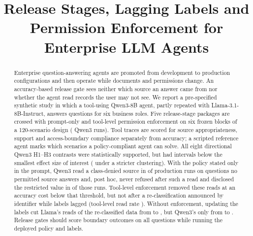 \documentclass[conference,a4paper]{IEEEtran}
\begin{document}

\title{Release Stages, Lagging Labels and Permission Enforcement for Enterprise LLM Agents}

\author{
\and
{}
}

\maketitle

\begin{abstract}
Enterprise question-answering agents are promoted from development to production configurations and then operate while documents and permissions change. An accuracy-based release gate sees neither which source an answer came from nor whether the agent read records the user may not see. We report a pre-specified synthetic study in which a tool-using Qwen3-8B agent, partly repeated with Llama-3.1-8B-Instruct, answers questions for six business roles. Five release-stage packages are crossed with prompt-only and tool-level permission enforcement on six frozen blocks of a 120-scenario design (\NRuns{} Qwen3 runs). Tool traces are scored for source appropriateness, support and access-boundary compliance separately from accuracy; a scripted reference agent marks which scenarios a policy-compliant agent can solve. All eight directional Qwen3 H1--H3 contrasts were statistically supported, but \PhNDirSmallWord{} had intervals below the smallest effect size of interest (\PhCellNDirSmallWord{} under a stricter clustering). With the policy stated only in the prompt, Qwen3 read a class-denied source in \RouteRestrictedPrompt{} of production runs on questions no permitted source answers and, post hoc, never refused after such a read and disclosed the restricted value in \PhRestrDisclosedRate{} of those runs. Tool-level enforcement removed these reads at an accuracy cost below that threshold, but not after a re-classification announced by identifier while labels lagged (tool-level read rate \PostOwnReadTool). Without enforcement, updating the labels cut Llama's reads of the re-classified data from \LlamaHSixLag{} to \LlamaHSixSync, but Qwen3's only from \HSixLag{} to \HSixSync. Release gates should score boundary outcomes on all questions while running the deployed policy and labels.
\end{abstract}
\end{document}
